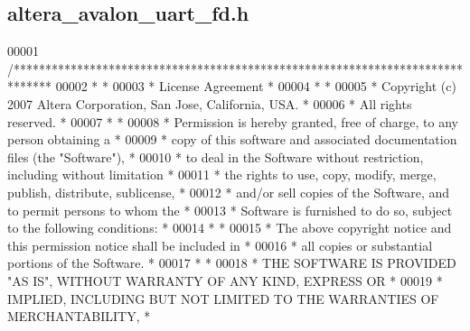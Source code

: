 \subsection{altera\+\_\+avalon\+\_\+uart\+\_\+fd.\+h}
\label{altera__avalon__uart__fd_8h_source}

\begin{DoxyCode}
00001 \textcolor{comment}{/******************************************************************************}
00002 \textcolor{comment}{*                                                                             *}
00003 \textcolor{comment}{* License Agreement                                                           *}
00004 \textcolor{comment}{*                                                                             *}
00005 \textcolor{comment}{* Copyright (c) 2007 Altera Corporation, San Jose, California, USA.           *}
00006 \textcolor{comment}{* All rights reserved.                                                        *}
00007 \textcolor{comment}{*                                                                             *}
00008 \textcolor{comment}{* Permission is hereby granted, free of charge, to any person obtaining a     *}
00009 \textcolor{comment}{* copy of this software and associated documentation files (the "Software"),  *}
00010 \textcolor{comment}{* to deal in the Software without restriction, including without limitation   *}
00011 \textcolor{comment}{* the rights to use, copy, modify, merge, publish, distribute, sublicense,    *}
00012 \textcolor{comment}{* and/or sell copies of the Software, and to permit persons to whom the       *}
00013 \textcolor{comment}{* Software is furnished to do so, subject to the following conditions:        *}
00014 \textcolor{comment}{*                                                                             *}
00015 \textcolor{comment}{* The above copyright notice and this permission notice shall be included in  *}
00016 \textcolor{comment}{* all copies or substantial portions of the Software.                         *}
00017 \textcolor{comment}{*                                                                             *}
00018 \textcolor{comment}{* THE SOFTWARE IS PROVIDED "AS IS", WITHOUT WARRANTY OF ANY KIND, EXPRESS OR  *}
00019 \textcolor{comment}{* IMPLIED, INCLUDING BUT NOT LIMITED TO THE WARRANTIES OF MERCHANTABILITY,    *}

\end{DoxyCode}

